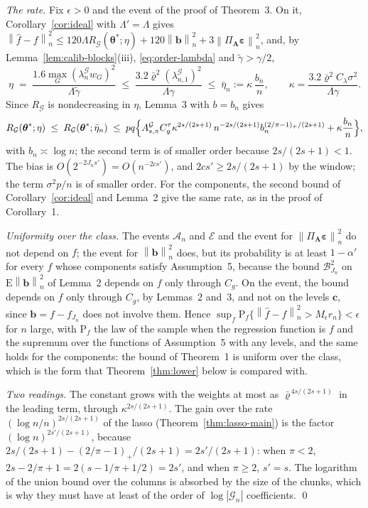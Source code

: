 \documentclass[10pt]{book}
\theoremstyle{definition}
\newcommand{\E}{\mathrm{E}}
\newcommand{\Prob}{\mathrm{P}}
\newcommand{\normn}[1]{\left\lVert #1 \right\rVert_{n}}
\newcommand{\btheta}{\boldsymbol{\theta}}
\newcommand{\thetastar}{\btheta^{*}}
\newcommand{\bc}{\mathbf{c}}
\newcommand{\pen}{\lambda}
\newcommand{\seff}{s'}
\newcommand{\Amat}{\mathbf{A}}
\newcommand{\PA}{\Pi_{\Amat}}
\newcommand{\bveps}{\boldsymbol{\varepsilon}}
\newcommand{\bb}{\mathbf{b}}
\newcommand{\gtil}{\widetilde{\gamma}}
\newcommand{\Gcal}{\mathcal{G}}
\newcommand{\bn}{b_{n}}
\newcommand{\Rid}{R_{\mathcal{G}}}
\newcommand{\lamG}{\lambda^{\mathcal{G}}_{n}}
\newcommand{\lamGone}{\lambda^{\mathcal{G}}_{n,1}}
\newcommand{\Ecal}{\mathcal{E}}
\newcommand{\Acal}{\mathcal{A}_{n}}
\newcommand{\AG}{A^{\mathcal{G}}_{s,\pi}}
\begin{document}
{\emph{The rate.} Fix $\epsilon > 0$ and the event of the proof of Theorem~3.
On it, Corollary~\ref{cor:ideal} with $\Lambda' = \Lambda$ gives
$\normn{\widehat{f}-f}^{2} \le 120\Lambda\Rid(\thetastar;\eta) +
120\normn{\bb}^{2} + 3\normn{\PA\bveps}^{2}$, and, by
Lemma~\ref{lem:calib-blocks}(iii), \eqref{eq:order-lambda} and
$\gtil > \gamma/2$,
\[
  \eta \;=\; \frac{1.6\max_{G}(\lamG w_{G})^{2}}{\Lambda\gtil}
  \;\le\; \frac{3.2\bar\varrho^{2}(\lamGone)^{2}}{\Lambda\gamma}
  \;\le\; \bar\eta_{n} := \kappa\,\frac{\bn}{n},
  \qquad
  \kappa = \frac{3.2\bar\varrho^{2}C_{\pen}\sigma^{2}}{\Lambda\gamma}.
\]
Since $\Rid$ is nondecreasing in $\eta$, Lemma~3 with $b = \bn$ gives
\[
  \Rid(\thetastar;\eta) \;\le\; \Rid(\thetastar;\bar\eta_{n})
  \;\le\; pq\Bigl\{\AG C_g^{\tau}\kappa^{2s/(2s+1)}\,n^{-2s/(2s+1)}
  \bn^{(2/\pi-1)_{+}/(2s+1)} + \kappa\frac{\bn}{n}\Bigr\},
\]
with $\bn \asymp \log n$; the second term is of smaller order because
$2s/(2s+1) < 1$. The bias is $O(2^{-2J_n\seff}) = O(n^{-2c\seff})$, and
$2c\seff \ge 2s/(2s+1)$ by the window; the term $\sigma^{2}p/n$ is of smaller
order. For the components, the second bound of Corollary~\ref{cor:ideal} and
Lemma~2 give the same rate, as in the proof of Corollary~1.

\emph{Uniformity over the class.} The events $\Acal$ and $\Ecal$ and the
event for $\normn{\PA\bveps}^{2}$ do not depend on $f$; the event for
$\normn{\bb}^{2}$ does, but its probability is at least $1-\alpha'$ for every
$f$ whose components satisfy Assumption~5, because the bound
$\mathcal{B}_{J_n}^{2}$ on $\E\normn{\bb}^{2}$ of Lemma~2 depends on $f$ only
through $C_g$. On the event, the bound depends on $f$ only through $C_g$, by
Lemmas~2 and~3, and not on the levels $\bc$, since $\bb = f - f_{J_n}$ does
not involve them. Hence
$\sup_{f}\Prob_{f}\{\normn{\widehat{f}-f}^{2} > M_\epsilon r_n\} < \epsilon$
for $n$ large, with $\Prob_{f}$ the law of the sample when the regression
function is $f$ and the supremum over the functions of Assumption~5 with any
levels, and the same holds for the components: the bound of Theorem~1 is
uniform over the class, which is the form that Theorem~\ref{thm:lower} below
is compared with.

\emph{Two readings.} The constant grows with the weights at most as
$\bar\varrho^{\,4s/(2s+1)}$ in the leading term, through
$\kappa^{2s/(2s+1)}$. The gain over the rate $(\log n/n)^{2s/(2s+1)}$ of the
lasso (Theorem~\ref{thm:lasso-main}) is the factor $(\log n)^{2\seff/(2s+1)}$,
because $2s/(2s+1) - (2/\pi-1)_{+}/(2s+1) = 2\seff/(2s+1)$: when $\pi < 2$,
$2s - 2/\pi + 1 = 2(s - 1/\pi + 1/2) = 2\seff$, and when $\pi \ge 2$,
$\seff = s$. The logarithm of the union bound over the columns is absorbed by
the size of the chunks, which is why they must have at least of the order of
$\log|\Gcal_{n}|$ coefficients. \qed

}
\end{document}
